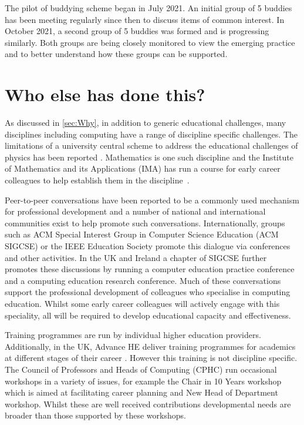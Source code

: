 \documentclass[sigconf]{acmart}
\begin{document}
\begin{comment}
To DO - evaluation of Buddying - PH what is needed here? Is sufficient to indicate the first pilot of 10 buddies has been established? Or do we need feedback from the participants?
\end{comment}

The pilot of buddying scheme began in July 2021. An initial group of 5
buddies has been meeting regularly since then to discuss items of
common interest. In October 2021, a second group of 5 buddies was
formed and is progressing similarly. Both groups are being closely
monitored to view the emerging practice and to better understand how
these groups can be supported.


\section{Who else has done this?}
As discussed in \ref{sec:Why}, in addition to generic educational
challenges, many disciplines including computing have a range of
discipline specific challenges. The limitations of a university
central scheme to address the educational challenges of physics has
been reported \cite{Magueijo2009}.  Mathematics is one such discipline
and the Institute of Mathematics and its Applications (IMA) has run a
course for early career colleagues to help establish them in the
discipline~\cite{IMA}.

Peer-to-peer conversations have been reported to be a commonly used
mechanism for professional development \cite{King2004} and a number of
national and international communities exist to help promote such
conversations. Internationally, groups such as ACM Special Interest
Group in Computer Science Education (ACM SIGCSE) or the IEEE Education
Society promote this dialogue via conferences and other activities.
In the UK and Ireland a chapter of SIGCSE further promotes these
discussions by running a computer education practice conference and a
computing education research conference. Much of these conversations
support the professional development of colleagues who specialise in
computing education. Whilst some early career colleagues will actively
engage with this speciality, all will be required to develop
educational capacity and effectiveness.
 
Training programmes are run by individual higher education
providers. Additionally, in the UK, Advance HE deliver training
programmes for academics at different stages of their career
\cite{HEATraining}. However this training is not discipline
specific. The Council of Professors and Heads of Computing (CPHC) run
occasional workshops in a variety of issues, for example the Chair in
10 Years workshop which is aimed at facilitating career planning and
New Head of Department workshop. Whilst these are well received
contributions developmental needs are broader than those supported by
these workshops.
\end{document}
